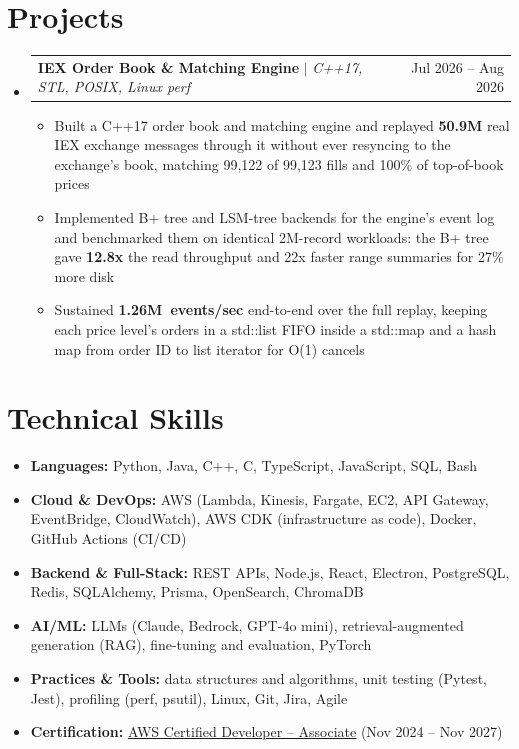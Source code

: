 \documentclass[letterpaper,10pt]{article}
\makeatletter
\newcommand{\resumeItem}[1]{\item{#1}\vspace{-1pt}}
\newcommand{\resumeProjectHeading}[2]{%
  \item
  \begin{tabular*}{\textwidth}{l@{\extracolsep{\fill}}r}
    #1 & #2 \\
  \end{tabular*}\vspace{-6pt}%
}
\newcommand{\resumeSubHeadingListStart}{\begin{itemize}[leftmargin=0in, label={}, itemsep=0pt, topsep=2pt]}
\newcommand{\resumeSubHeadingListEnd}{\end{itemize}}
\newcommand{\resumeItemListStart}{\begin{itemize}[leftmargin=0.18in, itemsep=0pt, topsep=1pt, parsep=0pt]}
\newcommand{\resumeItemListEnd}{\end{itemize}\vspace{0pt}}
\makeatother
\begin{document}
\section{Projects}
\resumeSubHeadingListStart
  \resumeProjectHeading
    {\textbf{IEX Order Book \& Matching Engine} $|$ \textit{C++17, STL, POSIX, Linux perf}}{Jul 2026 -- Aug 2026}
  \resumeItemListStart
    \resumeItem{Built a C++17 order book and matching engine and replayed \textbf{50.9M} real IEX exchange messages through it without ever resyncing to the exchange's book, matching 99,122 of 99,123 fills and 100\% of top-of-book prices}
    \resumeItem{Implemented B+ tree and LSM-tree backends for the engine's event log and benchmarked them on identical 2M-record workloads: the B+ tree gave \textbf{12.8x} the read throughput and 22x faster range summaries for 27\% more disk}
    \resumeItem{Sustained \mbox{\textbf{1.26M events/sec}} end-to-end over the full replay, keeping each price level's orders in a std::list FIFO inside a std::map and a hash map from order ID to list iterator for O(1) cancels}
  \resumeItemListEnd
\resumeSubHeadingListEnd

\section{Technical Skills}
\begin{itemize}[leftmargin=0in, label={}, itemsep=0pt, topsep=2pt]
  \small
  \item{\textbf{Languages:} Python, Java, C++, C, TypeScript, JavaScript, SQL, Bash}
  \item{\textbf{Cloud \& DevOps:} AWS (Lambda, Kinesis, Fargate, EC2, API Gateway, EventBridge, CloudWatch), AWS CDK (infrastructure as code), Docker, GitHub Actions (CI/CD)}
  \item{\textbf{Backend \& Full-Stack:} REST APIs, Node.js, React, Electron, PostgreSQL, Redis, SQLAlchemy, Prisma, OpenSearch, ChromaDB}
  \item{\textbf{AI/ML:} LLMs (Claude, Bedrock, GPT-4o mini), retrieval-augmented generation (RAG), fine-tuning and evaluation, PyTorch}
  \item{\textbf{Practices \& Tools:} data structures and algorithms, unit testing (Pytest, Jest), profiling (perf, psutil), Linux, Git, Jira, Agile}
  \item{\textbf{Certification:} \href{https://www.credly.com/badges/d2406a97-d937-47de-823b-724981159d3b/public_url}{\underline{AWS Certified Developer -- Associate}} (Nov 2024 -- Nov 2027)}
\end{itemize}
\end{document}
